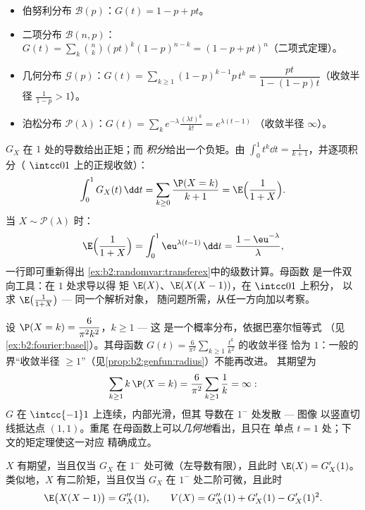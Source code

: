 \begin{example}[经典分布]\label{ex:b2:genfun:classical}
\leavevmode
\begin{itemize}
\item 伯努利分布 $\mathcal{B}(p)$：$G(t) = 1 - p + pt$。
\item 二项分布 $\mathcal{B}(n, p)$：$G(t) = \sum_k \binom nk
(pt)^k(1-p)^{n-k} = (1 - p + pt)^n$（二项式定理）。
\item 几何分布 $\mathcal{G}(p)$：$G(t) =
\sum_{k\geq1}(1-p)^{k-1}p\,t^k = \dfrac{pt}{1 - (1-p)t}$（收敛半径
$\frac{1}{1-p} > 1$）。
\item 泊松分布 $\mathcal{P}(\lambda)$：$G(t) =
\sum_k e^{-\lambda}\frac{(\lambda t)^k}{k!} = e^{\lambda(t - 1)}$
（收敛半径 $\infty$）。
\end{itemize}
\end{example}

\begin{example}[母函数的
积分]\label{ex:b2:genfun:integraltrick}
$G_X$ 在 $1$ 处的导数给出正矩；而
\emph{积分}给出一个负矩。由 $\int_0^1t^k\dd t
= \frac1{k+1}$，并逐项积分（
$\intcc01$ 上的正规收敛）：
\[
\int_0^1G_X(t)\,\dd t = \sum_{k\geq0}\frac{\P(X =
k)}{k+1} = \E\Bigl(\frac1{1+X}\Bigr).
\]
当 $X \sim \mathcal P(\lambda)$ 时：
\[
\E\Bigl(\frac1{1+X}\Bigr) =
\int_0^1\eu^{\lambda(t-1)}\,\dd t = \frac{1 -
\eu^{-\lambda}}{\lambda},
\]
一行即可重新得出
\cref{ex:b2:randomvar:transferex}中的级数计算。母函数
是一件双向工具：在 $1$ 处求导以得
矩 $\E(X)$、$\E(X(X-1))$，在 $\intcc01$ 上积分，
以求 $\E\bigl(\frac1{1+X}\bigr)$ --- 同一个解析对象，
随问题所需，从任一方向加以考察。
\end{example}

\begin{example}\label{ex:b2:genfun:heavytail}
设 $\P(X = k) = \dfrac{6}{\pi^2k^2}$，$k \geq 1$ --- 这
是一个概率分布，依据巴塞尔恒等式
（见\cref{ex:b2:fourier:basel}）。其母函数
$G(t) = \frac6{\pi^2}\sum_{k\geq1}\frac{t^k}{k^2}$ 的收敛半径
恰为 $1$：一般的界“收敛半径 $\geq
1$”（见\cref{prop:b2:genfun:radius}）不能再改进。
其期望为
\[
\sum_{k\geq1}k\,\P(X = k) =
\frac6{\pi^2}\sum_{k\geq1}\frac1k = \infty :
\]
$G$ 在 $\intcc{-1}1$ 上连续，内部光滑，但其
导数在 $1^-$ 处发散 --- 图像
以竖直切线抵达点 $(1, 1)$。重尾
在母函数上可以\emph{几何地}看出，且只在
单点 $t = 1$ 处；下文的矩定理使这一对应
精确成立。
\end{example}

\begin{theorem}[由母函数
求矩]\label{thm:b2:genfun:moments}
$X$ 有期望，当且仅当 $G_X$ 在 $1^-$
处可微（左导数有限），且此时 $\E(X) = G_X'(1)$。
类似地，$X$ 有二阶矩，当且仅当 $G_X$
在 $1^-$ 处二阶可微，且此时
\[
\E\bigl(X(X - 1)\bigr) = G_X''(1),
\qquad
V(X) = G_X''(1) + G_X'(1) - G_X'(1)^2 .
\]
\end{theorem}

